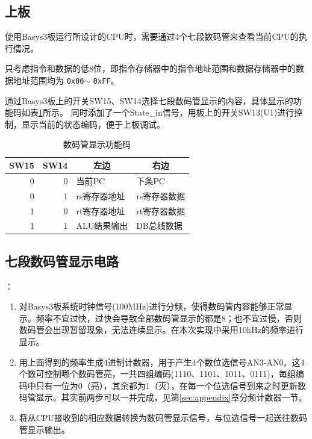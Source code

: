 
\subsection{上板}
\qquad 使用Basys3板运行所设计的CPU时，需要通过4个七段数码管来查看当前CPU的执行情况。
\par 只考虑指令和数据的低8位，即指令存储器中的指令地址范围和数据存储器中的数据地址范围均为 \verb'0x00'$\sim$ \verb'0xFF'。
\par 通过Basys3板上的开关SW15、SW14选择七段数码管显示的内容，具体显示的功能码如表\ref{tab:seg_code}所示。
同时添加了一个State\_in信号，用板上的开关SW13(U1)进行控制，显示当前的状态编码，便于上板调试。
\begin{table}[H]
  \centering\wuhao
  \caption{数码管显示功能码}
    \begin{tabular}{|r|r|l|l|}
    \hline
    \multicolumn{1}{|c|}{SW15} & \multicolumn{1}{c|}{SW14} & \multicolumn{1}{c|}{左边} & \multicolumn{1}{c|}{右边} \bigstrut\\
    \hline
    0     & 0     & 当前PC  & 下条PC \bigstrut\\
    \hline
    0     & 1     & rs寄存器地址 & rs寄存器数据 \bigstrut\\
    \hline
    1     & 0     & rt寄存器地址 & rt寄存器数据 \bigstrut\\
    \hline
    1     & 1     & ALU结果输出 & DB总线数据 \bigstrut\\
    \hline
    \end{tabular}%
  \label{tab:seg_code}%
\end{table}%

\subsection{七段数码管显示电路}
：
\begin{enumerate}
    \item 对Basys3板系统时钟信号(100MHz)进行分频，使得数码管内容能够正常显示。频率不宜过快，过快会导致全部数码管显示的都是8；也不宜过慢，否则数码管会出现暂留现象，无法连续显示。在本次实现中采用10kHz的频率进行显示。
    \item 用上面得到的频率生成4进制计数器，用于产生4个数位选信号AN3-AN0。这4个数可控制哪个数码管亮，一共四组编码(1110、1101、1011、0111)，每组编码中只有一位为0（亮），其余都为1（灭），在每一个位选信号到来之时更新数码管显示。其实前两步可以一并完成，见第\ref{sec:appendix}章分频计数器一节。
    \item 将从CPU接收到的相应数据转换为数码管显示信号，与位选信号一起送往数码管显示输出。
\end{enumerate}

